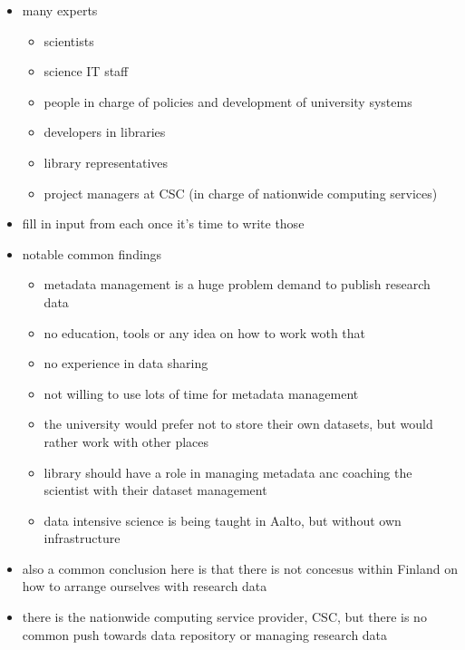 \begin{itemize}
    \item many experts
        \begin{itemize}
            \item scientists
            \item science IT staff
            \item people in charge of policies and development of university
                  systems
            \item developers in libraries
            \item library representatives
            \item project managers at CSC (in charge of nationwide computing
                  services)
        \end{itemize}
        \item fill in input from each once it's time to write those
        \item notable common findings
        \begin{itemize}
            \item metadata management is a huge problem
         demand to publish research data   \item no education, tools or any idea on how to work woth that
            \item no experience in data sharing
            \item not willing to use lots of time for metadata management
            \item the university would prefer not to store their own
                  datasets, but would rather work with other places
            \item library should have a role in managing metadata anc coaching
                  the scientist with their dataset management
            \item data intensive science is being taught in Aalto, but without
                  own infrastructure
        \end{itemize}
        \item also a common conclusion here is that there is not concesus
              within Finland on how to arrange ourselves with research data
        \item there is the nationwide computing service provider, CSC, but
              there is no common push towards data repository or managing
              research data
\end{itemize}

